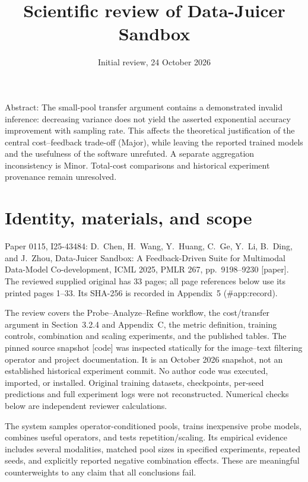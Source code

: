 \documentclass[10pt]{article}
\title{Scientific review of Data-Juicer Sandbox}
\author{}
\date{Initial review, 24 October 2026}
\begin{document}
\maketitle
Abstract: The small-pool transfer argument contains a demonstrated invalid inference: decreasing variance does not yield the asserted exponential accuracy improvement with sampling rate. This affects the theoretical justification of the central cost–feedback trade-off (Major), while leaving the reported trained models and the usefulness of the software unrefuted. A separate aggregation inconsistency is Minor. Total-cost comparisons and historical experiment provenance remain unresolved.\par
\section*{Identity, materials, and scope}
Paper 0115, I25-43484: D. Chen, H. Wang, Y. Huang, C. Ge, Y. Li, B. Ding, and J. Zhou, Data-Juicer Sandbox: A Feedback-Driven Suite for Multimodal Data-Model Co-development, ICML 2025, PMLR 267, pp. 9198–9230 [paper]. The reviewed supplied original has 33 pages; all page references below use its printed pages 1–33. Its SHA-256 is recorded in Appendix 5 (\#app:record).\par
The review covers the Probe–Analyze–Refine workflow, the cost/transfer argument in Section 3.2.4 and Appendix C, the metric definition, training controls, combination and scaling experiments, and the published tables. The pinned source snapshot [code] was inspected statically for the image–text filtering operator and project documentation. It is an October 2026 snapshot, not an established historical experiment commit. No author code was executed, imported, or installed. Original training datasets, checkpoints, per-seed predictions and full experiment logs were not reconstructed. Numerical checks below are independent reviewer calculations.\par
The system samples operator-conditioned pools, trains inexpensive probe models, combines useful operators, and tests repetition/scaling. Its empirical evidence includes several modalities, matched pool sizes in specified experiments, repeated seeds, and explicitly reported negative combination effects. These are meaningful counterweights to any claim that all conclusions fail.\par
\end{document}
